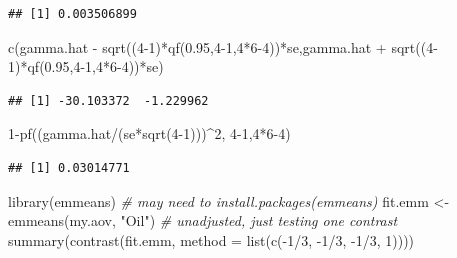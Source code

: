 \documentclass[
]{book}
\newenvironment{Shaded}{\begin{snugshade}}{\end{snugshade}}
\newcommand{\AttributeTok}[1]{\textcolor[rgb]{0.77,0.63,0.00}{#1}}
\newcommand{\CommentTok}[1]{\textcolor[rgb]{0.56,0.35,0.01}{\textit{#1}}}
\newcommand{\DecValTok}[1]{\textcolor[rgb]{0.00,0.00,0.81}{#1}}
\newcommand{\FloatTok}[1]{\textcolor[rgb]{0.00,0.00,0.81}{#1}}
\newcommand{\FunctionTok}[1]{\textcolor[rgb]{0.00,0.00,0.00}{#1}}
\newcommand{\NormalTok}[1]{#1}
\newcommand{\OtherTok}[1]{\textcolor[rgb]{0.56,0.35,0.01}{#1}}
\newcommand{\SpecialCharTok}[1]{\textcolor[rgb]{0.00,0.00,0.00}{#1}}
\newcommand{\StringTok}[1]{\textcolor[rgb]{0.31,0.60,0.02}{#1}}
\begin{document}
\begin{verbatim}
## [1] 0.003506899
\end{verbatim}

\begin{Shaded}
\begin{Highlighting}[]
\FunctionTok{c}\NormalTok{(gamma.hat }\SpecialCharTok{{-}} \FunctionTok{sqrt}\NormalTok{((}\DecValTok{4{-}1}\NormalTok{)}\SpecialCharTok{*}\FunctionTok{qf}\NormalTok{(}\FloatTok{0.95}\NormalTok{,}\DecValTok{4{-}1}\NormalTok{,}\DecValTok{4}\SpecialCharTok{*}\DecValTok{6{-}4}\NormalTok{))}\SpecialCharTok{*}\NormalTok{se,gamma.hat }\SpecialCharTok{+} \FunctionTok{sqrt}\NormalTok{((}\DecValTok{4{-}1}\NormalTok{)}\SpecialCharTok{*}\FunctionTok{qf}\NormalTok{(}\FloatTok{0.95}\NormalTok{,}\DecValTok{4{-}1}\NormalTok{,}\DecValTok{4}\SpecialCharTok{*}\DecValTok{6{-}4}\NormalTok{))}\SpecialCharTok{*}\NormalTok{se)}
\end{Highlighting}
\end{Shaded}

\begin{verbatim}
## [1] -30.103372  -1.229962
\end{verbatim}

\begin{Shaded}
\begin{Highlighting}[]
\DecValTok{1}\SpecialCharTok{{-}}\FunctionTok{pf}\NormalTok{((gamma.hat}\SpecialCharTok{/}\NormalTok{(se}\SpecialCharTok{*}\FunctionTok{sqrt}\NormalTok{(}\DecValTok{4{-}1}\NormalTok{)))}\SpecialCharTok{\^{}}\DecValTok{2}\NormalTok{, }\DecValTok{4{-}1}\NormalTok{,}\DecValTok{4}\SpecialCharTok{*}\DecValTok{6{-}4}\NormalTok{)}
\end{Highlighting}
\end{Shaded}

\begin{verbatim}
## [1] 0.03014771
\end{verbatim}

\begin{Shaded}
\begin{Highlighting}[]
\FunctionTok{library}\NormalTok{(emmeans) }\CommentTok{\# may need to install.packages(\textquotesingle{}emmeans\textquotesingle{})}
\NormalTok{fit.emm }\OtherTok{\textless{}{-}} \FunctionTok{emmeans}\NormalTok{(my.aov, }\StringTok{"Oil"}\NormalTok{)}
\CommentTok{\# unadjusted, just testing one contrast}
\FunctionTok{summary}\NormalTok{(}\FunctionTok{contrast}\NormalTok{(fit.emm, }\AttributeTok{method =} \FunctionTok{list}\NormalTok{(}\FunctionTok{c}\NormalTok{(}\SpecialCharTok{{-}}\DecValTok{1}\SpecialCharTok{/}\DecValTok{3}\NormalTok{, }\SpecialCharTok{{-}}\DecValTok{1}\SpecialCharTok{/}\DecValTok{3}\NormalTok{, }\SpecialCharTok{{-}}\DecValTok{1}\SpecialCharTok{/}\DecValTok{3}\NormalTok{, }\DecValTok{1}\NormalTok{))))}
\end{Highlighting}
\end{Shaded}
\end{document}
